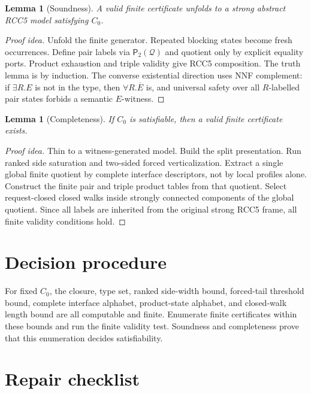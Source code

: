 \documentclass[11pt]{article}
\newtheorem{lemma}[theorem]{Lemma}
\newcommand{\Q}{\mathcal Q}
\newcommand{\Pairs}{\mathsf P_2}
\begin{document}
\begin{lemma}[Soundness]
A valid finite certificate unfolds to a strong abstract RCC5 model satisfying $C_0$.
\end{lemma}

\begin{proof}[Proof idea]
Unfold the finite generator.  Repeated blocking states become fresh occurrences.  Define pair labels via $\Pairs(\Q)$ and quotient only by explicit equality ports.  Product exhaustion and triple validity give RCC5 composition.  The truth lemma is by induction.  The converse existential direction uses NNF complement: if $\exists R.E$ is not in the type, then $\forall R.\overline E$ is, and universal safety over all $R$-labelled pair states forbids a semantic $E$-witness.
\end{proof}

\begin{lemma}[Completeness]
If $C_0$ is satisfiable, then a valid finite certificate exists.
\end{lemma}

\begin{proof}[Proof idea]
Thin to a witness-generated model.  Build the split presentation.  Run ranked side saturation and two-sided forced verticalization.  Extract a single global finite quotient by complete interface descriptors, not by local profiles alone.  Construct the finite pair and triple product tables from that quotient.  Select request-closed closed walks inside strongly connected components of the global quotient.  Since all labels are inherited from the original strong RCC5 frame, all finite validity conditions hold.
\end{proof}

\section{Decision procedure}

For fixed $C_0$, the closure, type set, ranked side-width bound, forced-tail threshold bound, complete interface alphabet, product-state alphabet, and closed-walk length bound are all computable and finite.  Enumerate finite certificates within these bounds and run the finite validity test.  Soundness and completeness prove that this enumeration decides satisfiability.

\section{Repair checklist}
\end{document}
